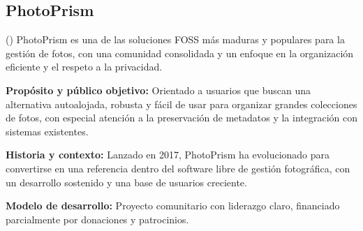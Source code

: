 
\subsection{PhotoPrism}

(\cite{photoprism-documentation}) PhotoPrism es una de las soluciones FOSS más maduras y populares para la gestión de fotos, con una comunidad consolidada y un enfoque en la organización eficiente y el respeto a la privacidad.

\textbf{Propósito y público objetivo:} Orientado a usuarios que buscan una alternativa autoalojada, robusta y fácil de usar para organizar grandes colecciones de fotos, con especial atención a la preservación de metadatos y la integración con sistemas existentes.

\textbf{Historia y contexto:} Lanzado en 2017, PhotoPrism ha evolucionado para convertirse en una referencia dentro del software libre de gestión fotográfica, con un desarrollo sostenido y una base de usuarios creciente.

\textbf{Modelo de desarrollo:} Proyecto comunitario con liderazgo claro, financiado parcialmente por donaciones y patrocinios.

